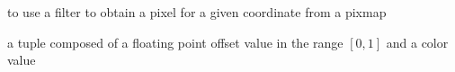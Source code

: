 to use a filter to obtain a pixel for a given coordinate from a pixmap

%
%
a tuple composed of a floating point offset value in the range $[0, 1]$ and a color value

